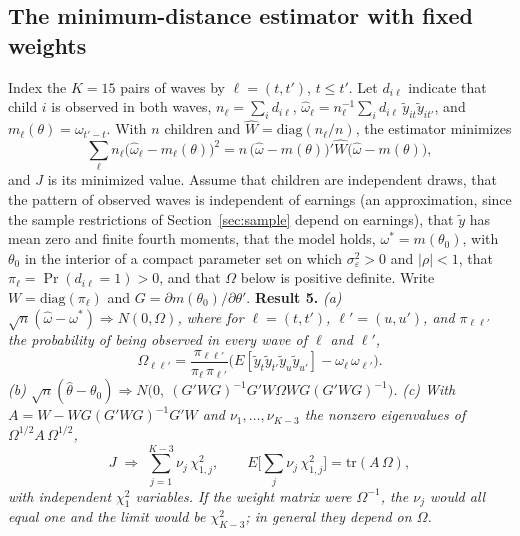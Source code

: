 \documentclass[11pt]{article}
\begin{document}
\subsection{The minimum-distance estimator with fixed weights}
\label{app:md}

Index the $K = 15$ pairs of waves by $\ell = (t, t')$, $t \le t'$. Let $d_{i\ell}$ indicate that child $i$ is observed in both waves, $n_\ell = \sum_i d_{i\ell}$, $\hat\omega_\ell = n_\ell^{-1}\sum_i d_{i\ell}\,\tilde y_{it}\tilde y_{it'}$, and $m_\ell(\theta) = \omega_{t'-t}$. With $n$ children and $\hat W = \mathrm{diag}(n_\ell/n)$, the estimator minimizes
\[
\textstyle\sum_\ell n_\ell\big(\hat\omega_\ell - m_\ell(\theta)\big)^2 = n\,\big(\hat\omega - m(\theta)\big)'\hat W\big(\hat\omega - m(\theta)\big),
\]
and $J$ is its minimized value.
Assume that children are independent draws, that the pattern of observed waves is independent of earnings (an approximation, since the sample restrictions of Section~\ref{sec:sample} depend on earnings), that $\tilde y$ has mean zero and finite fourth moments, that the model holds, $\omega^* = m(\theta_0)$, with $\theta_0$ in the interior of a compact parameter set on which $\sigma^2_\varepsilon > 0$ and $|\rho| < 1$, that $\pi_\ell = \Pr(d_{i\ell} = 1) > 0$, and that $\Omega$ below is positive definite. Write $W = \mathrm{diag}(\pi_\ell)$ and $G = \partial m(\theta_0)/\partial\theta'$.
\resultskip
\noindent\textbf{Result 5.} \emph{(a) $\sqrt{n}(\hat\omega - \omega^*) \Rightarrow N(0, \Omega)$, where for $\ell = (t,t')$, $\ell' = (u,u')$, and $\pi_{\ell\ell'}$ the probability of being observed in every wave of $\ell$ and $\ell'$,}
\begin{equation}
\Omega_{\ell\ell'} = \frac{\pi_{\ell\ell'}}{\pi_\ell\,\pi_{\ell'}}\Big(E[\tilde y_t\tilde y_{t'}\tilde y_u\tilde y_{u'}] - \omega_\ell\,\omega_{\ell'}\Big).
\label{eq:app-omega}
\end{equation}
\noindent\emph{(b) $\sqrt{n}(\hat\theta - \theta_0) \Rightarrow N\big(0,\ (G'WG)^{-1}G'W\Omega WG(G'WG)^{-1}\big)$.}
\partskip
\noindent\emph{(c) With $A = W - WG(G'WG)^{-1}G'W$ and $\nu_1, \dots, \nu_{K-3}$ the nonzero eigenvalues of $\Omega^{1/2}A\,\Omega^{1/2}$,}
\begin{equation}
J \;\Rightarrow\; \sum_{j=1}^{K-3}\nu_j\,\chi^2_{1,j}, \qquad E\Big[\sum_{j}\nu_j\,\chi^2_{1,j}\Big] = \mathrm{tr}(A\,\Omega),
\label{eq:app-J}
\end{equation}
\emph{with independent $\chi^2_1$ variables. If the weight matrix were $\Omega^{-1}$, the $\nu_j$ would all equal one and the limit would be $\chi^2_{K-3}$; in general they depend on $\Omega$.}
\end{document}
